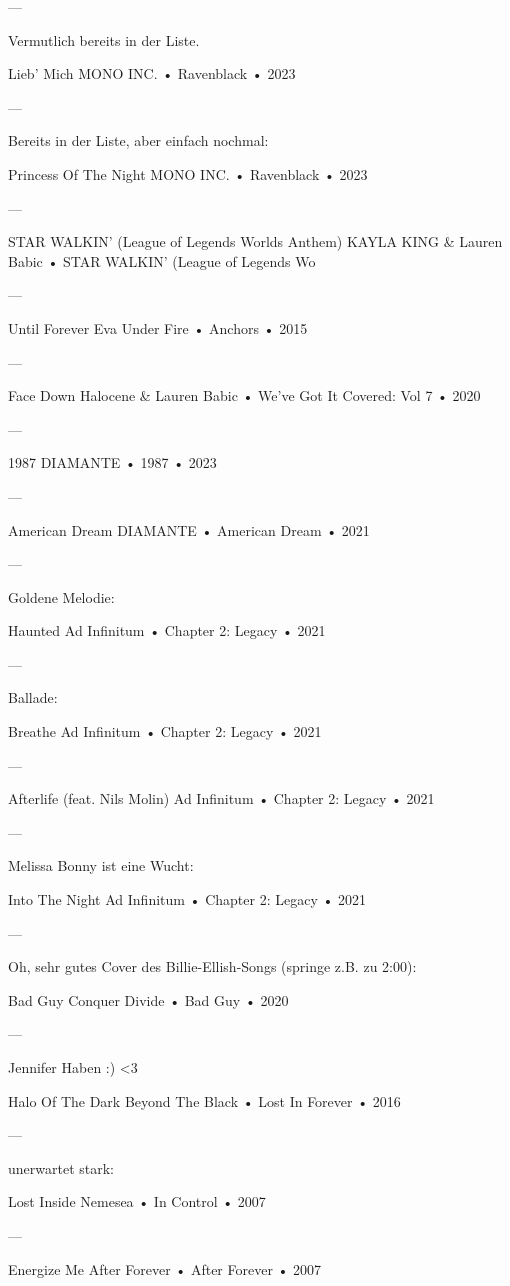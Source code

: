 —

Vermutlich bereits in der Liste.

Lieb' Mich
MONO INC.
 •
Ravenblack
 •
2023

—

Bereits in der Liste, aber einfach nochmal:

Princess Of The Night
MONO INC.
 •
Ravenblack
 •
2023

—

STAR WALKIN' (League of Legends Worlds Anthem)
KAYLA KING & Lauren Babic
 •
STAR WALKIN' (League of Legends Wo

—

Until Forever
Eva Under Fire
 •
Anchors
 •
2015

—

Face Down
Halocene
 &
Lauren Babic
 •
We've Got It Covered: Vol 7
 •
2020

—

1987
DIAMANTE
 •
1987
 •
2023

—

American Dream
DIAMANTE
 •
American Dream
 •
2021

—

Goldene Melodie:

Haunted
Ad Infinitum
 •
Chapter 2: Legacy
 •
2021

—

Ballade:

Breathe
Ad Infinitum
 •
Chapter 2: Legacy
 •
2021

—

Afterlife (feat. Nils Molin)
Ad Infinitum
 •
Chapter 2: Legacy
 •
2021

—

Melissa Bonny ist eine Wucht:

Into The Night
Ad Infinitum
 •
Chapter 2: Legacy
 •
2021

—

Oh, sehr gutes Cover des Billie-Ellish-Songs (springe z.B. zu 2:00):

Bad Guy
Conquer Divide
 •
Bad Guy
 •
2020

—

Jennifer Haben :) <3

Halo Of The Dark
Beyond The Black
 •
Lost In Forever
 •
2016

—

unerwartet stark:

Lost Inside
Nemesea
 •
In Control
 •
2007

—

Energize Me
After Forever
 •
After Forever
 •
2007

